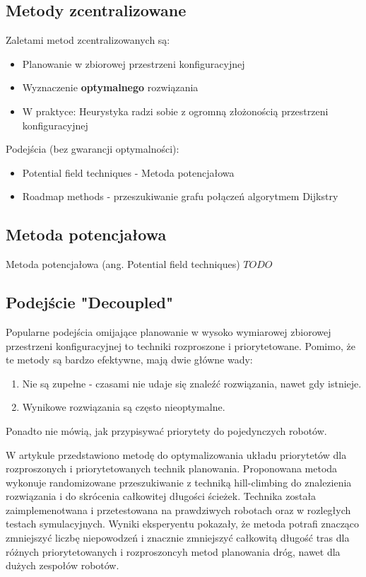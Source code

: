 \subsection{Metody zcentralizowane}
Zaletami metod zcentralizowanych są:
\begin{itemize}
	\item Planowanie w zbiorowej przestrzeni konfiguracyjnej
	\item Wyznaczenie {\bf optymalnego} rozwiązania
	\item W praktyce: Heurystyka radzi sobie z ogromną złożonością przestrzeni konfiguracyjnej
\end{itemize}

Podejścia (bez gwarancji optymalności):
\begin{itemize}
	\item Potential field techniques - Metoda potencjałowa
	\item Roadmap methods - przeszukiwanie grafu połączeń algorytmem Dijkstry
\end{itemize}

\subsection{Metoda potencjałowa}
Metoda potencjałowa (ang. Potential field techniques) $TODO$

\subsection{Podejście "Decoupled"}
Popularne podejścia omijające planowanie w wysoko wymiarowej zbiorowej przestrzeni konfiguracyjnej to techniki rozproszone i priorytetowane.
Pomimo, że te metody są bardzo efektywne, mają dwie główne wady:
\begin{enumerate}
	\item Nie są zupełne - czasami nie udaje się znaleźć rozwiązania, nawet gdy istnieje.
	\item Wynikowe rozwiązania są często nieoptymalne.
\end{enumerate}

Ponadto nie mówią, jak przypisywać priorytety do pojedynczych robotów.

W artykule \cite{optpriorities} przedstawiono metodę do optymalizowania układu priorytetów dla rozproszonych i priorytetowanych technik planowania.
Proponowana metoda wykonuje randomizowane przeszukiwanie z techniką hill-climbing do znalezienia rozwiązania i do skrócenia całkowitej długości ścieżek.
Technika została zaimplemenotwana i przetestowana na prawdziwych robotach oraz w rozległych testach symulacyjnych.
Wyniki eksperyentu pokazały, że metoda potrafi znacząco zmniejszyć liczbę niepowodzeń i znacznie zmniejszyć całkowitą długość tras dla różnych priorytetowanych i rozproszoncyh metod planowania dróg, nawet dla dużych zespołów robotów.

